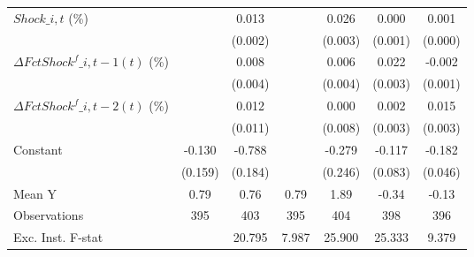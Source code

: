 {\begin{tabular}{l*{6}{c}}
\addlinespace
$ Shock\_{i,t}$ (\%) &                     &       0.013\sym{***}&                     &       0.026\sym{***}&       0.000         &       0.001         \\
                    &                     &     (0.002)         &                     &     (0.003)         &     (0.001)         &     (0.000)         \\
\addlinespace
$ \Delta FctShock^f\_{i,t-1}(t)$ (\%)&                     &       0.008\sym{*}  &                     &       0.006         &       0.022\sym{***}&      -0.002         \\
                    &                     &     (0.004)         &                     &     (0.004)         &     (0.003)         &     (0.001)         \\
\addlinespace
$ \Delta FctShock^f\_{i,t-2}(t)$ (\%)&                     &       0.012         &                     &       0.000         &       0.002         &       0.015\sym{***}\\
                    &                     &     (0.011)         &                     &     (0.008)         &     (0.003)         &     (0.003)         \\
\addlinespace
Constant            &      -0.130         &      -0.788\sym{***}&                     &      -0.279         &      -0.117         &      -0.182\sym{***}\\
                    &     (0.159)         &     (0.184)         &                     &     (0.246)         &     (0.083)         &     (0.046)         \\
\midrule
Mean Y              &        0.79         &        0.76         &        0.79         &        1.89         &       -0.34         &       -0.13         \\
Observations        &         395         &         403         &         395         &         404         &         398         &         396         \\
Exc. Inst. F-stat   &                     &      20.795         &       7.987         &      25.900         &      25.333         &       9.379         \\
\bottomrule
\end{tabular}
}
